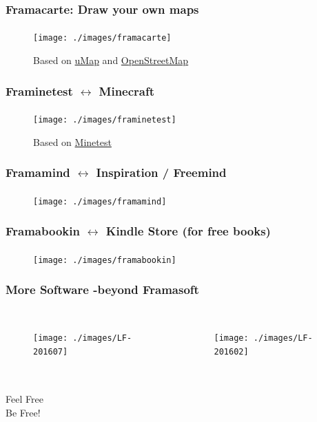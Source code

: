 	\begin{frame}
	\frametitle{Framacarte: Draw your own maps}
	\framesubtitle{}
	        \begin{figure}[h]
                \centering
                \texttt{[image: ./images/framacarte]}
		\caption{Based on \href{https://github.com/umap-project/umap/}{uMap} and \href{https://www.openstreetmap.org}{OpenStreetMap}} 
        	\end{figure}
	\end{frame}

	\begin{frame}
	\frametitle{Framinetest $\leftrightarrow$ Minecraft}
	\framesubtitle{}
	        \begin{figure}[h]
                \centering
                \texttt{[image: ./images/framinetest]}
		\caption{Based on \href{http://www.minetest.net}{Minetest}}
        	\end{figure}
	\end{frame}

	\begin{frame}
	\frametitle{Framamind $\leftrightarrow$ Inspiration / Freemind}
	\framesubtitle{}
	        \begin{figure}[h]
                \centering
                \texttt{[image: ./images/framamind]}
        	\end{figure}
	\end{frame}

	\begin{frame}
	\frametitle{Framabookin $\leftrightarrow$ Kindle Store (for free books)}
	\framesubtitle{}
	        \begin{figure}[h]
                \centering
                \texttt{[image: ./images/framabookin]}
        	\end{figure}
	\end{frame}

	\begin{frame}
	\frametitle{More Software -beyond Framasoft}
	\framesubtitle{}
	\begin{columns}
		\column{0.5\textwidth}
	        	\begin{figure}[h]
               		\centering
                	\texttt{[image: ./images/LF-201607]}
        		\end{figure}
		\column{0.5\textwidth}
	        	\begin{figure}[h]
                	\centering
                	\texttt{[image: ./images/LF-201602]}
        		\end{figure}
	\end{columns}
	\end{frame}








	\begin{frame}
	\frametitle{}
	\framesubtitle{}
	\centering\huge
	Feel Free\\
	Be Free!
	\end{frame}




